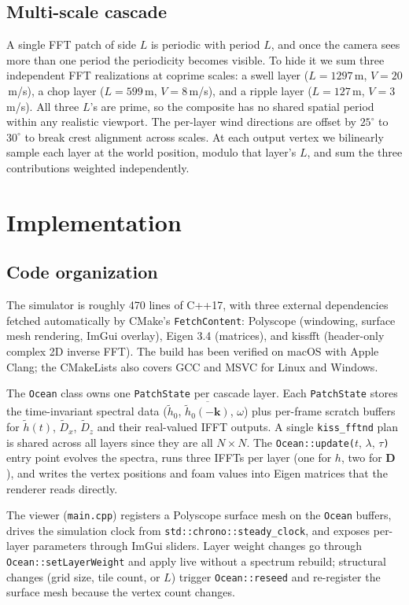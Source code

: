 \documentclass[10pt,letterpaper]{article}
\begin{document}
\subsection{Multi-scale cascade}
A single FFT patch of side $L$ is periodic with period $L$, and once the
camera sees more than one period the periodicity becomes visible. To hide it
we sum three independent FFT realizations at coprime scales: a swell layer
($L=1297$\,m, $V=20$\,m/s), a chop layer ($L=599$\,m, $V=8$\,m/s), and a
ripple layer ($L=127$\,m, $V=3$\,m/s). All three $L$'s are prime, so the
composite has no shared spatial period within any realistic viewport. The
per-layer wind directions are offset by $25^\circ$ to $30^\circ$ to break
crest alignment across scales. At each output vertex we bilinearly sample
each layer at the world position, modulo that layer's $L$, and sum the
three contributions weighted independently.

\section{Implementation}

\subsection{Code organization}
The simulator is roughly 470 lines of C++17, with three external
dependencies fetched automatically by CMake's \texttt{FetchContent}:
Polyscope (windowing, surface mesh rendering, ImGui overlay), Eigen 3.4
(matrices), and kissfft (header-only complex 2D inverse FFT). The build
has been verified on macOS with Apple Clang; the CMakeLists also covers
GCC and MSVC for Linux and Windows.

The \texttt{Ocean} class owns one \texttt{PatchState} per cascade layer.
Each \texttt{PatchState} stores the time-invariant spectral data
($\tilde{h}_0$, $\overline{\tilde{h}_0(-\mathbf{k})}$, $\omega$) plus
per-frame scratch buffers for $\tilde{h}(t)$, $\tilde{D}_x$, $\tilde{D}_z$
and their real-valued IFFT outputs. A single \texttt{kiss\_fftnd} plan is
shared across all layers since they are all $N\times N$. The
\texttt{Ocean::update($t,\,\lambda,\,\tau$)} entry point evolves the spectra,
runs three IFFTs per layer (one for $h$, two for $\mathbf{D}$), and writes
the vertex positions and foam values into Eigen matrices that the renderer
reads directly.

The viewer (\texttt{main.cpp}) registers a Polyscope surface mesh on the
\texttt{Ocean} buffers, drives the simulation clock from
\texttt{std::chrono::steady\_clock}, and exposes per-layer parameters
through ImGui sliders. Layer weight changes go through
\texttt{Ocean::setLayerWeight} and apply live without a spectrum rebuild;
structural changes (grid size, tile count, or $L$) trigger
\texttt{Ocean::reseed} and re-register the surface mesh because the
vertex count changes.
\end{document}
